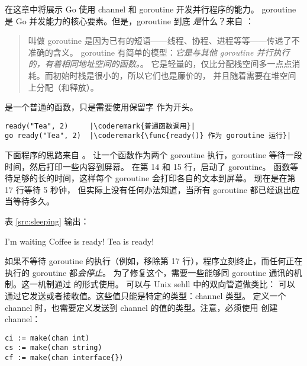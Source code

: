 \noindent{}在这章中将展示 Go 使用 channel 和 goroutine 开发并行程序的能力。
goroutine 是 Go 并发能力的核心要素。但是，goroutine 到底 \emph{是}什么？来自
\cite{effective_go}：
\begin{quote}
叫做 goroutine 是因为已有的短语——线程、协程、进程等等——传递了不准确的含义。
goroutine 有简单的模型：\emph{它是与其他 goroutine 并行执行的，有着相同地址空间的函数。}。
它是轻量的，仅比分配栈空间多一点点消耗。而初始时栈是很小的，所以它们也是廉价的，
并且随着需要在堆空间上分配（和释放）。
\end{quote}
 是一个普通的函数，只是需要使用保留字
 作为开头。
\begin{lstlisting}
ready("Tea", 2)	    |\coderemark{普通函数调用}|
go ready("Tea", 2)  |\coderemark{\func{ready()} 作为 goroutine 运行}|
\end{lstlisting}
下面程序的思路来自 \cite{go_course_day3}。
让一个函数作为两个 goroutine 执行，goroutine 等待一段时间，然后打印一些内容到屏幕。
在第 14 和 15 行，启动了 goroutine。
 函数等待足够的长的时间，这样每个 goroutine 会打印各自的文本到屏幕。
现在是在第 17 行等待 5 秒钟，
但实际上没有任何办法知道，当所有 goroutine 都已经退出应当等待多久。 

表 \ref{src:sleeping} 输出：
\begin{display}
I'm waiting         
Coffee is ready!    
Tea is ready!       
\end{display}
如果不等待 goroutine 的执行（例如，移除第 17 行），程序立刻终止，而任何正在执行的 
goroutine 都\emph{会停止}。
为了修复这个，需要一些能够同 goroutine 通讯的机制。这一机制通过  
的形式使用。 可以与 Unix sehll 中的双向管道做类比：
可以通过它发送或者接收值。这些值只能是特定的类型：channel 类型。
定义一个 channel 时，也需要定义发送到 channel 的值的类型。注意，必须使用
 创建 channel：
\begin{lstlisting}
ci := make(chan int)
cs := make(chan string)
cf := make(chan interface{})
\end{lstlisting}
